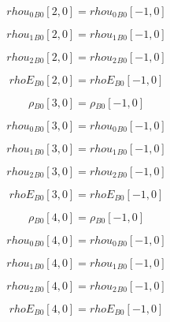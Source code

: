 \documentclass{article}
\begin{document}
\begin{dmath}{rhou_{0}{_{B0}}}[{2,0}] = {rhou_{0}{_{B0}}}[{-1,0}]\end{dmath}

\begin{dmath}{rhou_{1}{_{B0}}}[{2,0}] = {rhou_{1}{_{B0}}}[{-1,0}]\end{dmath}

\begin{dmath}{rhou_{2}{_{B0}}}[{2,0}] = {rhou_{2}{_{B0}}}[{-1,0}]\end{dmath}

\begin{dmath}{rhoE{_{B0}}}[{2,0}] = {rhoE{_{B0}}}[{-1,0}]\end{dmath}

\begin{dmath}{\rho{_{B0}}}[{3,0}] = {\rho{_{B0}}}[{-1,0}]\end{dmath}

\begin{dmath}{rhou_{0}{_{B0}}}[{3,0}] = {rhou_{0}{_{B0}}}[{-1,0}]\end{dmath}

\begin{dmath}{rhou_{1}{_{B0}}}[{3,0}] = {rhou_{1}{_{B0}}}[{-1,0}]\end{dmath}

\begin{dmath}{rhou_{2}{_{B0}}}[{3,0}] = {rhou_{2}{_{B0}}}[{-1,0}]\end{dmath}

\begin{dmath}{rhoE{_{B0}}}[{3,0}] = {rhoE{_{B0}}}[{-1,0}]\end{dmath}

\begin{dmath}{\rho{_{B0}}}[{4,0}] = {\rho{_{B0}}}[{-1,0}]\end{dmath}

\begin{dmath}{rhou_{0}{_{B0}}}[{4,0}] = {rhou_{0}{_{B0}}}[{-1,0}]\end{dmath}

\begin{dmath}{rhou_{1}{_{B0}}}[{4,0}] = {rhou_{1}{_{B0}}}[{-1,0}]\end{dmath}

\begin{dmath}{rhou_{2}{_{B0}}}[{4,0}] = {rhou_{2}{_{B0}}}[{-1,0}]\end{dmath}

\begin{dmath}{rhoE{_{B0}}}[{4,0}] = {rhoE{_{B0}}}[{-1,0}]\end{dmath}
\end{document}
